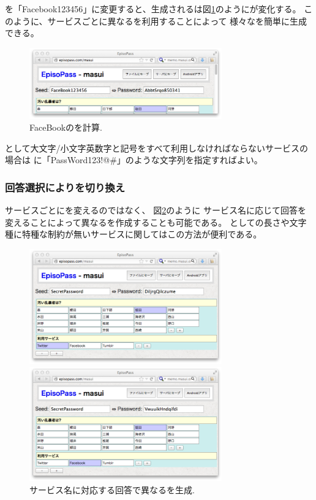 \documentclass[twoside]{wiss}
\begin{document}
{\SS}を「\textsf{Facebook123456}」に変更すると、生成される{\PW}は図\ref{web2}のようにが変化する。
このように、サービスごとに異なる{\SS}を利用することによって
様々な{\PW}を簡単に生成できる。

\begin{figure}[H]
\centerline{\includegraphics[width=83mm,bb=0 0 718 265]{figures/36c371a13a8250c60fb9c03174382443.png}}
\caption{FaceBookの{\PW}を計算.}
\label{web2}
\end{figure}

{\PW}として大文字/小文字英数字と記号をすべて利用しなければならないサービスの場合は
{\SS}に「\textsf{PassWord123!@\#}」のような文字列を指定すればよい。

\subsubsection{回答選択により{\PW}を切り換え}
\label{pwgen}

サービスごとに{\SS}を変えるのではなく、
図\ref{web3}のように
サービス名に応じて回答を変えることによって異なる{\PW}を作成することも可能である。
{\PW}としての長さや文字種に特種な制約が無いサービスに関してはこの方法が便利である。

\begin{figure}[H]
\centerline{\includegraphics[width=83mm,bb=0 0 718 428]{figures/a9167a6ec6af9c70dd1617e3fc25ec30.png}}
\centerline{\includegraphics[width=83mm,bb=0 0 718 428]{figures/5b887fabeb8e3319623901fe4a6c56f2.png}}
\caption{サービス名に対応する回答で異なる{\PW}を生成.}
\label{web3}
\end{figure}
\end{document}
